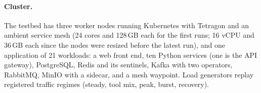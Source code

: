 \paragraph{Cluster.} The testbed has three worker nodes running Kubernetes with Tetragon and an ambient service mesh
(24 cores and 128\,GB each for the first runs; 16 vCPU and 36\,GB each since the nodes were resized before the latest
run), and one application of 21 workloads: a web front end, ten Python services (one is the API gateway), PostgreSQL,
Redis and its sentinels, Kafka with two operators, RabbitMQ, MinIO with a sidecar, and a mesh waypoint. Load generators replay registered traffic regimes (steady,
tool mix, peak, burst, recovery).
